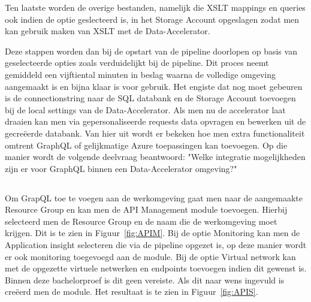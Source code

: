 Ten laatste worden de overige bestanden, namelijk die XSLT mappings en queries ook indien de optie geslecteerd is, in het Storage Account opgeslagen zodat men kan gebruik maken van XSLT met de Data-Accelerator.

Deze stappen worden dan bij de opstart van de pipeline doorlopen op basis van geselecteerde opties zoals verduidelijkt bij de pipeline. Dit proces neemt gemiddeld een vijftiental minuten in beslag waarna de volledige omgeving aangemaakt is en bijna klaar is voor gebruik.
Het engiste dat nog moet gebeuren is de connectionstring naar de SQL databank en de Storage Account toevoegen bij de local settings van de Data-Accelerator. Als men nu de accelerator laat draaien kan men via gepersonaliseerde requests data opvragen en bewerken uit de gecreëerde databank. Van hier uit wordt er bekeken hoe men extra functionaliteit omtrent GraphQL of gelijkmatige Azure toepassingen kan toevoegen. Op die manier wordt de volgende deelvraag beantwoord: "Welke integratie mogelijkheden zijn er voor GraphQL binnen een Data-Accelerator omgeving?"

\subsection{}%
\label{sec:Implementatie GraphQL}

Om GrapQL toe te voegen aan de werkomgeving gaat men naar de aangemaakte Resource Group en kan men de API Management module toevoegen.
Hierbij selecteerd men de Resource Group en de naam die de werkomgeving moet krijgen. Dit is te zien in Figuur~\ref{fig:APIM}.
Bij de optie Monitoring kan men de Application insight selecteren die via de pipeline opgezet is, op deze manier wordt er ook monitoring toegevoegd aan de module. Bij de optie Virtual network kan met de opgezette virtuele netwerken en endpoints toevoegen indien dit gewenst is. Binnen deze bachelorproef is dit geen vereiste. Als dit naar wens ingevuld is creëerd men de module. Het resultaat is te zien in Figuur~\ref{fig:APIS}.


